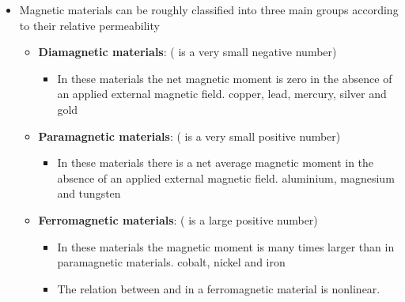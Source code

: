 \begin{ELunit}

\begin{itemize}
\tightlist
\item
  Magnetic materials can be roughly classified into three main groups according to their relative permeability

  \begin{itemize}
  \tightlist
  \item
    \textbf{Diamagnetic materials}:  ( is a very small negative number)

    \begin{itemize}
    \tightlist
    \item
      In these materials the net magnetic moment is zero in the absence of an applied external magnetic field. \ELim{\ELto} copper, lead, mercury, silver and gold \ELim{\ELto} 
    \end{itemize}
  \item
    \textbf{Paramagnetic materials}:  ( is a very small positive number)

    \begin{itemize}
    \tightlist
    \item
      In these materials there is a net average magnetic moment in the absence of an applied external magnetic field. \ELim{\ELto} aluminium, magnesium and tungsten \ELim{\ELto} 
    \end{itemize}
  \item
    \textbf{Ferromagnetic materials}:  ( is a large positive number)

    \begin{itemize}
    \tightlist
    \item
      In these materials the magnetic moment is many times larger than in paramagnetic materials. \ELim{\ELto} cobalt, nickel and iron
    \item
      The relation between  and  in a ferromagnetic material is nonlinear.
    \end{itemize}
  \end{itemize}
\end{itemize}


\end{ELunit}

\ELhold

